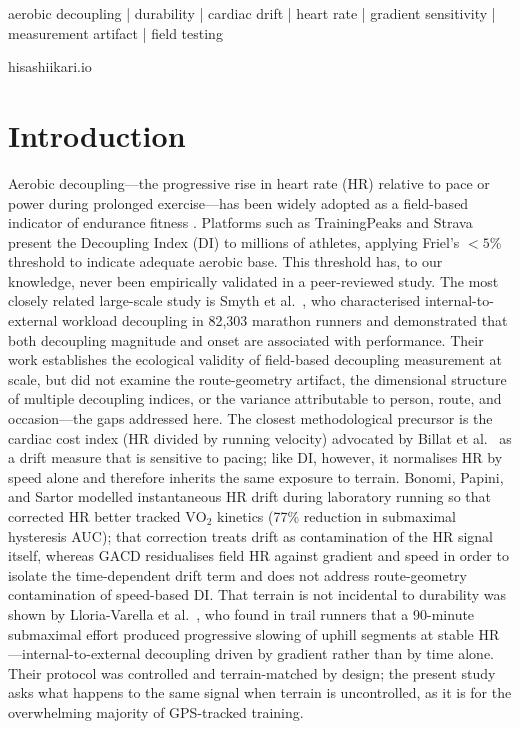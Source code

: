 \documentclass[times, twoside]{zHenriquesLab-StyleBioRxiv}
\begin{document}
\begin{abstract}
multi-session profiling provides a more \textit{reproducible} individual signal---reliability, not criterion validity---for longitudinal monitoring.
\end{abstract}

\begin{keywords}
aerobic decoupling | durability | cardiac drift | heart rate | gradient sensitivity | measurement artifact | field testing
\end{keywords}

\begin{corrauthor}
hisashi\at ikari.io
\end{corrauthor}

\section*{Introduction}

Aerobic decoupling---the progressive rise in heart rate (HR) relative to pace or power during prolonged exercise---has been widely adopted as a field-based indicator of endurance fitness \cite{coyle2001, friel2009}. Platforms such as TrainingPeaks and Strava present the Decoupling Index (DI) to millions of athletes, applying Friel's $<5\%$ threshold to indicate adequate aerobic base. This threshold has, to our knowledge, never been empirically validated in a peer-reviewed study. The most closely related large-scale study is Smyth et al.\ \cite{smyth2022}, who characterised internal-to-external workload decoupling in 82,303 marathon runners and demonstrated that both decoupling magnitude and onset are associated with performance. Their work establishes the ecological validity of field-based decoupling measurement at scale, but did not examine the route-geometry artifact, the dimensional structure of multiple decoupling indices, or the variance attributable to person, route, and occasion---the gaps addressed here. The closest methodological precursor is the cardiac cost index (HR divided by running velocity) advocated by Billat et al.\ \cite{billat2020} as a drift measure that is sensitive to pacing; like DI, however, it normalises HR by speed alone and therefore inherits the same exposure to terrain. Bonomi, Papini, and Sartor \cite{bonomi2024} modelled instantaneous HR drift during laboratory running so that corrected HR better tracked $\mathrm{VO}_2$ kinetics (77\% reduction in submaximal hysteresis AUC); that correction treats drift as contamination of the HR signal itself, whereas GACD residualises field HR against gradient and speed in order to isolate the time-dependent drift term and does not address route-geometry contamination of speed-based DI. That terrain is not incidental to durability was shown by Lloria-Varella et al.\ \cite{lloria2025}, who found in trail runners that a 90-minute submaximal effort produced progressive slowing of uphill segments at stable HR---internal-to-external decoupling driven by gradient rather than by time alone. Their protocol was controlled and terrain-matched by design; the present study asks what happens to the same signal when terrain is uncontrolled, as it is for the overwhelming majority of GPS-tracked training.
\end{document}
